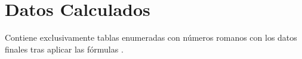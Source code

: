 \chapter{Datos Calculados}
Contiene exclusivamente tablas enumeradas con números romanos con los datos finales tras aplicar las fórmulas \supercite{ejemplo2026}.


